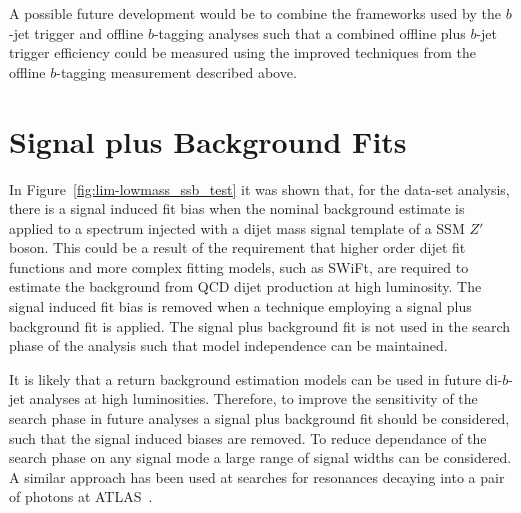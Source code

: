 A possible future development would be to combine the frameworks used by the $b$-jet trigger and offline $b$-tagging analyses such that
a combined offline plus $b$-jet trigger efficiency could be measured using the improved techniques from the offline $b$-tagging measurement described above.

\section{Signal plus Background Fits}

In Figure~\ref{fig:lim-lowmass_ssb_test} it was shown that, for the \lm{} data-set analysis,
there is a signal induced fit bias when the nominal background estimate is applied to a
spectrum injected with a dijet mass signal template of a SSM $Z'$ boson.
This could be a result of the requirement that higher order dijet fit functions
and more complex fitting models, such as SWiFt, are required to estimate the background from QCD dijet production at high luminosity.
The signal induced fit bias is removed when a technique employing a signal plus background fit is applied.
The signal plus background fit is not used in the search phase of the \lm{} analysis such that model independence can be maintained.

It is likely that a return background estimation models can be used in future di-$b$-jet analyses at high luminosities.
Therefore, to improve the sensitivity of the search phase in future analyses
a signal plus background fit should be considered, such that the signal induced biases are removed.
To reduce dependance of the search phase on any signal mode a large range of signal widths can be considered. 
A similar approach has been used at searches for resonances decaying into a pair of photons at ATLAS~\cite{fut-diphoton}.



